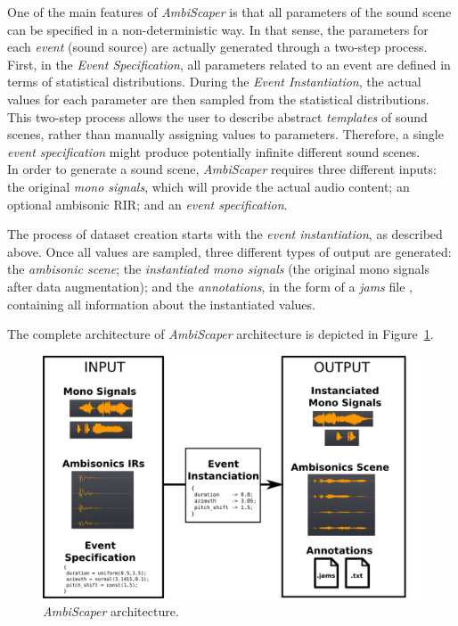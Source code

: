 One of the main features of \textit{AmbiScaper} is that all parameters of the sound scene can be specified in a non-deterministic way. In that sense, the parameters for each \textit{event} (sound source) are actually generated through a two-step process. First, in the \textit{Event Specification}, all parameters related to an event are defined in terms of statistical distributions. During the \textit{Event Instantiation}, the actual values for each parameter are then sampled from the statistical distributions.
This two-step process allows the user to describe abstract \textit{templates} of sound scenes, rather than manually assigning values to parameters. Therefore, a single \textit{event specification} might produce potentially infinite different sound scenes. \\


\newpage
In order to generate a sound scene, \textit{AmbiScaper} requires three different inputs: the original \textit{mono signals}, which will provide the actual audio content; an optional ambisonic RIR; and an \textit{event specification}. 

The process of dataset creation starts with the \textit{event instantiation}, as described above. Once all values are sampled, three different types of output are generated: the \textit{ambisonic scene}; the \textit{instantiated mono signals} (the original mono signals after data augmentation); and the \textit{annotations}, in the form of a \textit{jams} file \cite{humphrey2014jams}, containing all information about the instantiated values. 

The complete architecture of \textit{AmbiScaper} architecture is depicted in Figure~\ref{fig:architecture}.\\


\begin{figure}
  \centering
	\includegraphics[width=\textwidth]{Figures/DataGeneration/figure_architecture_V2.png}
    \caption{\textit{AmbiScaper} architecture.}
	\label{fig:architecture}
\end{figure}

